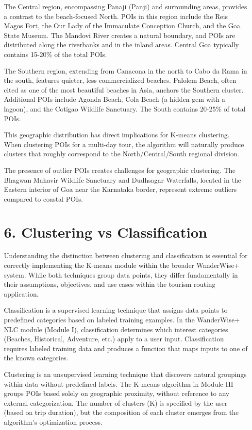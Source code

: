 The Central region, encompassing Panaji (Panji) and surrounding areas, provides a contrast to the beach-focused North. POIs in this region include the Reis Magos Fort, the Our Lady of the Immaculate Conception Church, and the Goa State Museum. The Mandovi River creates a natural boundary, and POIs are distributed along the riverbanks and in the inland areas. Central Goa typically contains 15-20\% of the total POIs.

The Southern region, extending from Canacona in the north to Cabo da Rama in the south, features quieter, less commercialized beaches. Palolem Beach, often cited as one of the most beautiful beaches in Asia, anchors the Southern cluster. Additional POIs include Agonda Beach, Cola Beach (a hidden gem with a lagoon), and the Cotigao Wildlife Sanctuary. The South contains 20-25\% of total POIs.

This geographic distribution has direct implications for K-means clustering. When clustering POIs for a multi-day tour, the algorithm will naturally produce clusters that roughly correspond to the North/Central/South regional division.

The presence of outlier POIs creates challenges for geographic clustering. The Bhagwan Mahavir Wildlife Sanctuary and Dudhsagar Waterfalls, located in the Eastern interior of Goa near the Karnataka border, represent extreme outliers compared to coastal POIs.

\section{6. Clustering vs Classification}

Understanding the distinction between clustering and classification is essential for correctly implementing the K-means module within the broader WanderWise+ system. While both techniques group data points, they differ fundamentally in their assumptions, objectives, and use cases within the tourism routing application.

Classification is a supervised learning technique that assigns data points to predefined categories based on labeled training examples. In the WanderWise+ NLC module (Module I), classification determines which interest categories (Beaches, Historical, Adventure, etc.) apply to a user input. Classification requires labeled training data and produces a function that maps inputs to one of the known categories.

Clustering is an unsupervised learning technique that discovers natural groupings within data without predefined labels. The K-means algorithm in Module III groups POIs based solely on geographic proximity, without reference to any external categorization. The number of clusters (K) is specified by the user (based on trip duration), but the composition of each cluster emerges from the algorithm's optimization process.


